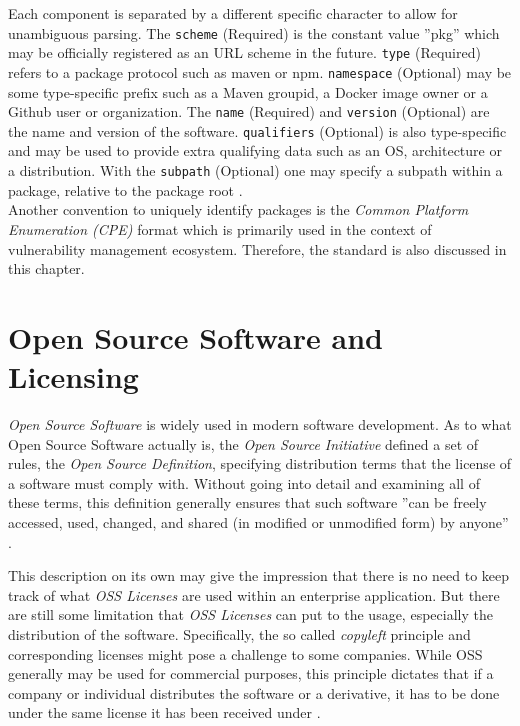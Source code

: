 Each component is separated by a different specific character to allow for unambiguous parsing. The \lstinline|scheme| (Required) is the constant value ''pkg'' which may be officially registered as an URL scheme in the future. \lstinline|type| (Required) refers to a package protocol such as maven or npm. \lstinline|namespace| (Optional) may be some type-specific prefix such as a Maven groupid, a Docker image owner or a Github user or organization. The \lstinline|name| (Required) and \lstinline|version| (Optional) are the name and version of the software. \lstinline|qualifiers| (Optional) is also type-specific and may be used to provide extra qualifying data such as an OS, architecture or a distribution. With the \lstinline|subpath| (Optional) one may specify a subpath within a package, relative to the package root \cite{purl}.\\

Another convention to uniquely identify packages is the \textit{Common Platform Enumeration (CPE)} format which is primarily used in the context of vulnerability management ecosystem. Therefore, the standard is also discussed in this chapter.

\section{Open Source Software and Licensing}
\textit{Open Source Software} is widely used in modern software development. As to what Open Source Software actually is, the \textit{Open Source Initiative} defined a set of rules, the \textit{Open Source Definition}, specifying distribution terms that the license of a software must comply with. Without going into detail and examining all of these terms, this definition generally ensures that such software ''can be freely accessed, used, changed, and shared (in modified or unmodified form) by anyone'' \cite{OSI}.\par
This description on its own may give the impression that there is no need to keep track of what \textit{OSS Licenses} are used within an enterprise application. But there are still some limitation that \textit{OSS Licenses} can put to the usage, especially the distribution of the software. Specifically, the so called \textit{copyleft} principle and corresponding licenses might pose a challenge to some companies. While OSS generally may be used for commercial purposes, this principle dictates that if a company or individual distributes the software or a derivative, it has to be done under the same license it has been received under \cite{OSI}.\\


